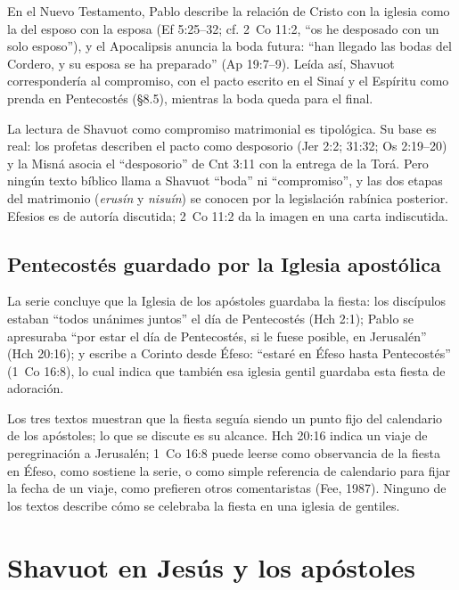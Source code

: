 \documentclass[11pt,letterpaper]{article}
\begin{document}
En el Nuevo Testamento, Pablo describe la relación de Cristo con la iglesia como la del esposo con la esposa (Ef 5:25--32; cf. 2~Co 11:2, ``os he desposado con un solo esposo''), y el Apocalipsis anuncia la boda futura: ``han llegado las bodas del Cordero, y su esposa se ha preparado'' (Ap 19:7--9). Leída así, Shavuot correspondería al compromiso, con el pacto escrito en el Sinaí y el Espíritu como prenda en Pentecostés (§8.5), mientras la boda queda para el final.

\begin{nota}[Precisión]
La lectura de Shavuot como compromiso matrimonial es tipológica. Su base es real: los profetas describen el pacto como desposorio (Jer 2:2; 31:32; Os 2:19--20) y la Misná asocia el ``desposorio'' de Cnt 3:11 con la entrega de la Torá. Pero ningún texto bíblico llama a Shavuot ``boda'' ni ``compromiso'', y las dos etapas del matrimonio (\emph{erusín} y \emph{nisuín}) se conocen por la legislación rabínica posterior. Efesios es de autoría discutida; 2~Co 11:2 da la imagen en una carta indiscutida.
\end{nota}

\subsection{Pentecostés guardado por la Iglesia apostólica}

La serie concluye que la Iglesia de los apóstoles guardaba la fiesta: los discípulos estaban ``todos unánimes juntos'' el día de Pentecostés (Hch 2:1); Pablo se apresuraba ``por estar el día de Pentecostés, si le fuese posible, en Jerusalén'' (Hch 20:16); y escribe a Corinto desde Éfeso: ``estaré en Éfeso hasta Pentecostés'' (1~Co 16:8), lo cual indica que también esa iglesia gentil guardaba esta fiesta de adoración.

\begin{nota}[Precisión]
Los tres textos muestran que la fiesta seguía siendo un punto fijo del calendario de los apóstoles; lo que se discute es su alcance. Hch 20:16 indica un viaje de peregrinación a Jerusalén; 1~Co 16:8 puede leerse como observancia de la fiesta en Éfeso, como sostiene la serie, o como simple referencia de calendario para fijar la fecha de un viaje, como prefieren otros comentaristas (Fee, 1987). Ninguno de los textos describe cómo se celebraba la fiesta en una iglesia de gentiles.
\end{nota}

\section{Shavuot en Jesús y los apóstoles}
\end{document}
